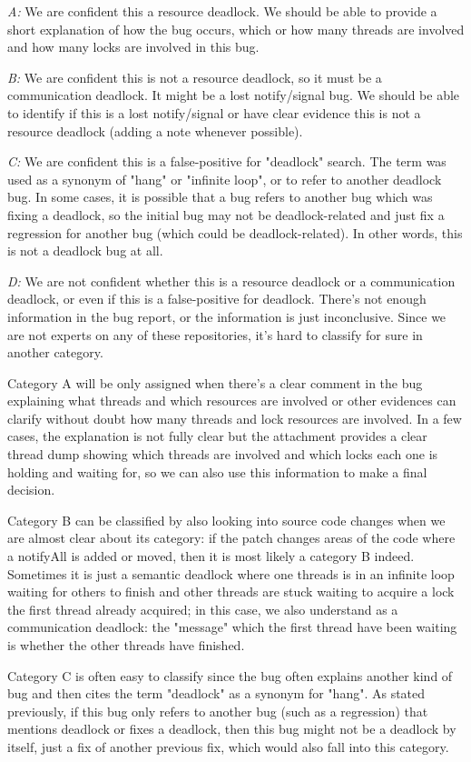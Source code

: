 \emph{A:} We are confident this a resource deadlock. We should be able to provide a short explanation of how the bug occurs, which or how many threads are involved and how many locks are involved in this bug.

\emph{B:} We are confident this is not a resource deadlock, so it must be a communication deadlock. It might be a lost notify/signal bug. We should be able to identify if this is a lost notify/signal or have clear evidence this is not a resource deadlock (adding a note whenever possible).

\emph{C:} We are confident this is a false-positive for "deadlock" search. The term was used as a synonym of "hang" or "infinite loop", or to refer to another deadlock bug. In some cases, it is possible that a bug refers to another bug which was fixing a deadlock, so the initial bug may not be deadlock-related and just fix a regression for another bug (which could be deadlock-related). In other words, this is not a deadlock bug at all.

\emph{D:} We are not confident whether this is a resource deadlock or a communication deadlock, or even if this is a false-positive for deadlock. There's not enough information in the bug report, or the information is just inconclusive. Since we are not experts on any of these repositories, it's hard to classify for sure in another category.

Category A will be only assigned when there's a clear comment in the bug explaining what threads and which resources are involved or other evidences can clarify without doubt how many threads and lock resources are involved. In a few cases, the explanation is not fully clear but the attachment provides a clear thread dump showing which threads are involved and which locks each one is holding and waiting for, so we can also use this information to make a final decision.

Category B can be classified by also looking into source code changes when we are almost clear about its category: if the patch changes areas of the code where a notifyAll is added or moved, then it is most likely a category B indeed. Sometimes it is just a semantic deadlock where one threads is in an infinite loop waiting for others to finish and other threads are stuck waiting to acquire a lock the first thread already acquired; in this case, we also understand as a communication deadlock: the "message" which the first thread have been waiting is whether the other threads have finished.

Category C is often easy to classify since the bug often explains another kind of bug and then cites the term "deadlock" as a synonym for "hang". As stated previously, if this bug only refers to another bug (such as a regression) that mentions deadlock or fixes a deadlock, then this bug might not be a deadlock by itself, just a fix of another previous fix, which would also fall into this category.

